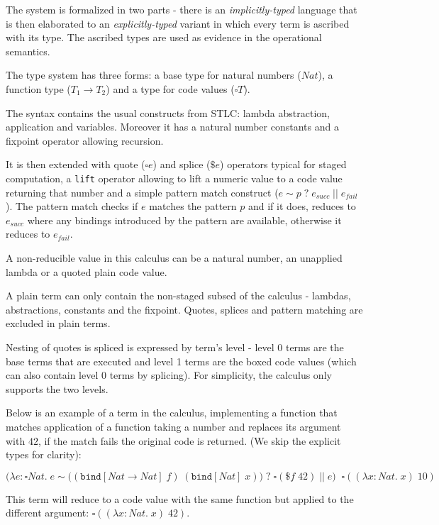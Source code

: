 \documentclass[runningheads]{article}
\begin{document}
The system is formalized in two parts - there is an \textit{implicitly-typed} language that is then elaborated to an \textit{explicitly-typed} variant in which every term is ascribed with its type. The ascribed types are used as evidence in the operational semantics.

The type system has three forms: a base type for natural numbers ($Nat$), a function type ($T_1 \to T_2$) and a type for code values ($\square T$).

The syntax contains the usual constructs from STLC: lambda abstraction, application and variables. Moreover it has a natural number constants and a fixpoint operator allowing recursion.

It is then extended with quote ($\square e$) and splice ($\$e$) operators typical for staged computation, a \verb|lift| operator allowing to lift a numeric value to a code value returning that number and a simple pattern match construct ($e \sim p \; ? \; e_{succ} \; || \; e_{fail}$).
The pattern match checks if $e$ matches the pattern $p$ and if it does, reduces to $e_{succ}$ where any bindings introduced by the pattern are available, otherwise it reduces to $e_{fail}$.

A non-reducible value in this calculus can be a natural number, an unapplied lambda or a quoted plain code value. 

A plain term can only contain the non-staged subsed of the calculus - lambdas, abstractions, constants and the fixpoint. Quotes, splices and pattern matching are excluded in plain terms.

Nesting of quotes is spliced is expressed by term's level - level 0 terms are the base terms that are executed and level 1 terms are the boxed code values (which can also contain level 0 terms by splicing). For simplicity, the calculus only supports the two levels.

Below is an example of a term in the calculus, implementing a function that matches application of a function taking a number and replaces its argument with $42$, if the match fails the original code is returned. (We skip the explicit types for clarity):

\begin{equation*}
  \Big(\lambda e: \square Nat. \; e \sim \big((\texttt{bind} [Nat \to Nat] \; f) \; (\texttt{bind} [Nat] \; x)\big) \; ? \; \square(\$f \; 42) \; || \; e \Big) \;\; \square((\lambda x: Nat. \; x) \; 10)
\end{equation*}

This term will reduce to a code value with the same function but applied to the different argument: $\square((\lambda x: Nat. \; x) \; 42)$.
\end{document}
